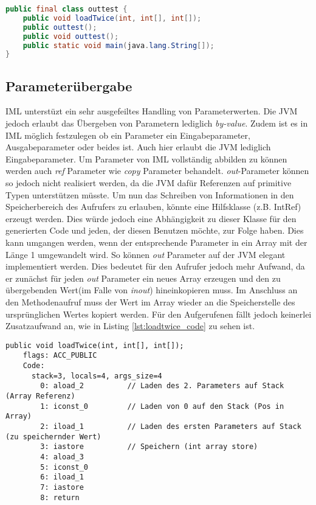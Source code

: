 \begin{lstlisting}[caption=Struktur der Klasse,language=Java,label={lst:outtest_class}]
public final class outtest {
    public void loadTwice(int, int[], int[]);
    public outtest();
    public void outtest();
    public static void main(java.lang.String[]);
}
\end{lstlisting}


\subsection {Parameterübergabe}

IML unterstüzt ein sehr ausgefeiltes Handling von Parameterwerten. Die JVM jedoch erlaubt 
das Übergeben von Parametern lediglich \textit{by-value}. Zudem ist es in IML möglich 
festzulegen ob ein Parameter ein Eingabeparameter, Ausgabeparameter oder beides ist. Auch hier 
erlaubt die JVM lediglich Eingabeparameter. Um Parameter von IML vollständig abbilden zu können 
werden auch \textit{ref} Parameter wie \textit{copy} Parameter behandelt. \textit{out}-Parameter 
können so jedoch nicht realisiert werden, da die JVM dafür Referenzen auf primitive Typen 
unterstützen müsste. Um nun das Schreiben von Informationen in den Speicherbereich des Aufrufers
zu erlauben, könnte eine Hilfsklasse (z.B. IntRef) erzeugt werden. Dies würde jedoch eine 
Abhängigkeit zu dieser Klasse für den generierten Code und jeden, der diesen Benutzen möchte, 
zur Folge haben. Dies kann umgangen werden, wenn der entsprechende Parameter in ein Array mit
der Länge 1 umgewandelt wird. So können \textit{out} Parameter auf der JVM elegant implementiert werden.
Dies bedeutet für den Aufrufer jedoch mehr Aufwand, da er zunächst für jeden \textit{out} Parameter 
ein neues Array erzeugen und den zu übergebenden Wert(im Falle von \textit{inout}) hineinkopieren muss. 
Im Anschluss an den Methodenaufruf muss der Wert im Array wieder an die Speicherstelle des ursprünglichen 
Wertes kopiert werden. Für den Aufgerufenen fällt jedoch keinerlei Zusatzaufwand an, wie in Listing 
\ref{lst:loadtwice_code} zu sehen ist.
\newline

\begin{lstlisting}[caption=Bytecode der loadTwice Prozedur ohne conditions,label={lst:loadtwice_code}]
public void loadTwice(int, int[], int[]);
    flags: ACC_PUBLIC
    Code:
      stack=3, locals=4, args_size=4
        0: aload_2          // Laden des 2. Parameters auf Stack (Array Referenz)
        1: iconst_0         // Laden von 0 auf den Stack (Pos in Array)
        2: iload_1          // Laden des ersten Parameters auf Stack (zu speichernder Wert)
        3: iastore          // Speichern (int array store)
        4: aload_3       
        5: iconst_0      
        6: iload_1       
        7: iastore       
        8: return
\end{lstlisting}


